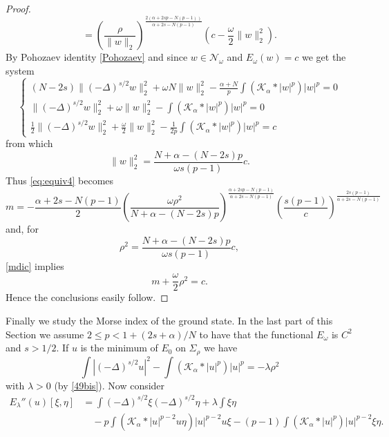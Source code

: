 \documentclass[10pt]{amsart}
\numberwithin{equation}{section}
\begin{document}
\begin{proof}
\begin{equation}
	=
	\left(\frac{\rho}{\|w\|_2}\right)^{\frac{2(\alpha+2sp-N(p-1))}{\alpha + 2s - N(p-1)}} 
	\left(c-\frac{\omega}{2}\|w\|_2^2\right).
	\end{equation}
	By Pohozaev identity \eqref{Pohozaev} 
	and since  $w\in\mathcal{N}_{\omega}$ and $E_\omega(w)=c$ we get  the system
	\[
	\begin{cases}
	\displaystyle 
	(N-2s) \| (-\Delta)^{s/2} w \|_2^2 
	+ \omega N \| w \|_2^2 
	- \frac{\alpha + N}{p} \int(\mathcal{K}_\alpha * |w|^p)|w|^p
	=0\\
	\displaystyle 
	\| (-\Delta)^{s/2} w \|_2^2
	+ \omega \| w \|_2^2
	- \int(\mathcal{K}_\alpha * |w|^p)|w|^p
	=0\\
	\displaystyle 
	\frac{1}{2} \| (-\Delta)^{s/2} w \|_2^2 
	+ \frac{\omega}{2} \| w \|_2^2
	- \frac{1}{2p}\int(\mathcal{K}_\alpha * |w|^p)|w|^p
	=c
	\end{cases}
	\]
	from which
	\[
	\| w \|_2^2
	=\frac{N+\alpha - (N-2s)p}{\omega s (p-1)} c.
	\]
	Thus \eqref{eq:equiv4} becomes
	\begin{equation}
	\label{mdic}
	m=
	-\frac{\alpha+2s-N(p-1)}{2}
	\left(\frac{\omega\rho^2}{N+\alpha - (N-2s)p}\right)^{\frac{\alpha+2sp-N(p-1)}{\alpha+2s-N(p-1)}}
	\left(\frac{s(p-1)}{c}\right)^{\frac{2s(p-1)}{\alpha+2s-N(p-1)}}
	\end{equation}
	and, for
	\[
	\rho^2=\frac{N+\alpha - (N-2s)p}{\omega s (p-1)} c,
	\]
	\eqref{mdic} implies
	\[
	m+\frac{\omega}{2}\rho^2=c.
	\]
	Hence the conclusions easily follow.
\end{proof}

\noindent
 Finally we study the Morse index of the ground state. In the last part
 of this Section we assume $2 \leq p<1+(2s+\alpha)/N$ 
 to have that the  functional $E_{\omega}$ is $C^{2}$
 and $s>1/2$.
If $ u$ is  the minimum of $E_0$ on $\Sigma_{\rho}$ we have
\begin{equation}\label{nehari}
\int |(-\Delta)^{s/2}u |^2 -\int (\mathcal K_{\alpha}*|u|^{p})|u|^{p} = - \lambda \rho^{2}
\end{equation}
with $\lambda>0$ (by  \eqref{49bis}).
Now consider
\begin{equation}\label{$E''$}
\begin{split}
E_{\lambda}''(u)[\xi, \eta]&=  \int (-\Delta)^{s/2}\xi (-\Delta)^{s/2}\eta +\lambda\int \xi\eta  \\
&\quad- p \int \left({\mathcal K}_{\alpha}* |u|^{p-2}u \eta\right) |u|^{p-2}u\xi 
- (p-1)\int \left(\mathcal K_{\alpha}* |u|^{p} \right) |u|^{p-2}  \xi \eta.
\end{split}
\end{equation}
\end{document}
